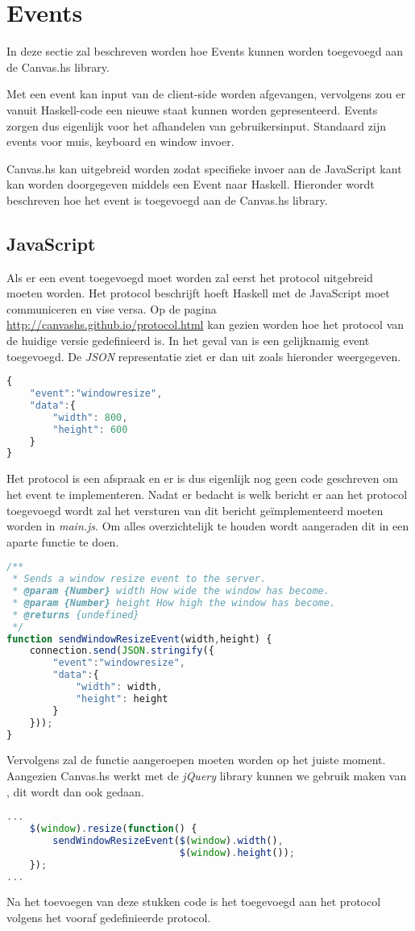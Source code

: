 \section{Events}
In deze sectie zal beschreven worden hoe Events kunnen worden toegevoegd aan de Canvas.hs library.

Met een event kan input van de client-side worden afgevangen, vervolgens zou er vanuit Haskell-code een nieuwe staat kunnen worden gepresenteerd. Events zorgen dus eigenlijk voor het afhandelen van gebruikersinput. Standaard zijn events voor muis, keyboard en window invoer.

Canvas.hs kan uitgebreid worden zodat specifieke invoer aan de JavaScript kant kan worden doorgegeven middels een Event naar Haskell. Hieronder wordt beschreven hoe het  event is toegevoegd aan de Canvas.hs library.
\subsection{JavaScript}
Als er een event toegevoegd moet worden zal eerst het protocol uitgebreid moeten worden. Het protocol beschrijft hoeft Haskell met de JavaScript moet communiceren en vise versa. Op de pagina \url{http://canvashs.github.io/protocol.html} kan gezien worden hoe het protocol van de huidige versie gedefinieerd is. In het geval van  is een gelijknamig event toegevoegd. De \emph{JSON} representatie ziet er dan uit zoals hieronder weergegeven.
\begin{lstlisting}[language=JavaScript]
{
    "event":"windowresize",
    "data":{
        "width": 800,
        "height": 600
    }
}
\end{lstlisting}
Het protocol is een afspraak en er is dus eigenlijk nog geen code geschreven om het event te implementeren. Nadat er bedacht is welk bericht er aan het protocol toegevoegd wordt zal het versturen van dit bericht ge\"implementeerd moeten worden in \emph{main.js}. Om alles overzichtelijk te houden wordt aangeraden dit in een aparte functie te doen.
\begin{lstlisting}[language=JavaScript]
/**
 * Sends a window resize event to the server.
 * @param {Number} width How wide the window has become.
 * @param {Number} height How high the window has become.
 * @returns {undefined}
 */
function sendWindowResizeEvent(width,height) {
    connection.send(JSON.stringify({
        "event":"windowresize",
        "data":{
            "width": width,
            "height": height
        }
    }));
}
\end{lstlisting}
Vervolgens zal de functie  aangeroepen moeten worden op het juiste moment. Aangezien Canvas.hs werkt met de \emph{jQuery} library kunnen we gebruik maken van , dit wordt dan ook gedaan.
\begin{lstlisting}[language=JavaScript]
...
    $(window).resize(function() {
        sendWindowResizeEvent($(window).width(),
        					  $(window).height());
    });
...
\end{lstlisting}
Na het toevoegen van deze stukken code is het  toegevoegd aan het protocol volgens het vooraf gedefinieerde protocol.

